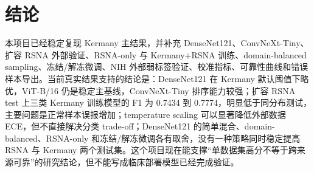 \chapter{结论}

本项目已经稳定复现 Kermany 主结果，并补充 DenseNet121、ConvNeXt-Tiny、扩容 RSNA 外部验证、RSNA-only 与 Kermany+RSNA 训练、domain-balanced sampling、冻结/解冻微调、NIH 外部弱标签验证、校准指标、可靠性曲线和错误样本导出。当前真实结果支持的结论是：DenseNet121 在 Kermany 默认阈值下略优，ViT-B/16 仍是稳定主基线，ConvNeXt-Tiny 排序能力较强；扩容 RSNA test 上三类 Kermany 训练模型的 F1 为 0.7434 到 0.7774，明显低于同分布测试，主要问题是正常样本误报增加；temperature scaling 可以显著降低外部数据 ECE，但不直接解决分类 trade-off；DenseNet121 的简单混合、domain-balanced、RSNA-only 和冻结/解冻微调各有取舍，没有一种策略同时稳定提高 RSNA 与 Kermany 两个测试集。这个项目现在能支撑“单数据集高分不等于跨来源可靠”的研究结论，但不能写成临床部署模型已经完成验证。
